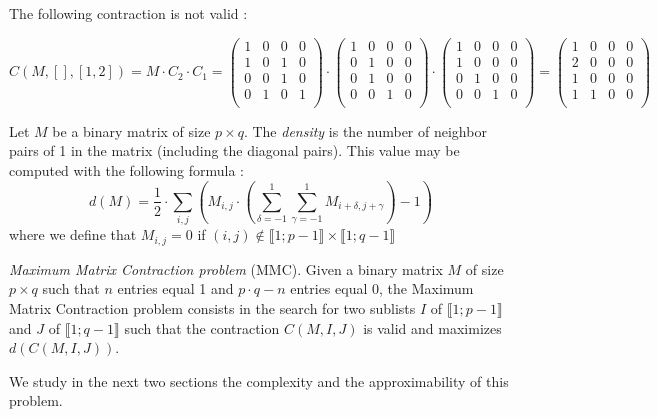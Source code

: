 \begin{example}
	The following contraction is not valid :
	
	$$
	C(M,[],[1,2]) = M \cdot C_2 \cdot C_1 = \begin{pmatrix}
	1 & 0 & 0 & 0 \\
	1 & 0 & 1 & 0 \\
	0 & 0 & 1 & 0 \\
	0 & 1 & 0 & 1 \\
	\end{pmatrix} \cdot \begin{pmatrix}
	1 & 0 & 0 & 0 \\
	0 & 1 & 0 & 0 \\
	0 & 1 & 0 & 0 \\
	0 & 0 & 1 & 0 \\
	\end{pmatrix} \cdot\begin{pmatrix}
	1 & 0 & 0 & 0 \\
	1 & 0 & 0 & 0 \\
	0 & 1 & 0 & 0 \\
	0 & 0 & 1 & 0 \\
	\end{pmatrix}  = \begin{pmatrix}
	1 & 0 & 0 & 0 \\
	2 & 0 & 0 & 0 \\
	1 & 0 & 0 & 0 \\
	1 & 1 & 0 & 0 \\
	\end{pmatrix}
	$$
\end{example}

\begin{definition}
	\label{def:density}
	Let $M$ be a binary matrix of size $p \times q$. The \emph{density} is the number of neighbor pairs of 1 in the matrix (including the diagonal pairs). This value may be computed with the following formula :
	$$ 
	d(M) = \frac{1}{2} \cdot \sum\limits_{i,j} \left( M_{i,j} \cdot \left(\sum\limits_{\delta = -1}^1 \sum\limits_{\gamma = -1}^1  M_{i+\delta,j+\gamma}\right) - 1 \right)
	$$
	where we define that $M_{i,j}=0$ if $(i,j) \notin \llbracket 1;p-1 \rrbracket \times \llbracket 1;q-1 \rrbracket$
\end{definition}

\begin{problem}\label{problem1}
	\emph{Maximum Matrix Contraction problem} (MMC). Given a binary matrix $M$ of size $p \times q$ such that $n$ entries equal 1 and $p \cdot q - n$ entries equal 0, the Maximum Matrix Contraction problem consists in the search for two sublists $I$ of $\llbracket 1;p-1 \rrbracket$ and $J$ of $\llbracket 1;q-1 \rrbracket$ such that the contraction $C(M,I,J)$ is valid and maximizes $d(C(M,I,J))$.
\end{problem}

We study in the next two sections the complexity and the approximability of this problem.


